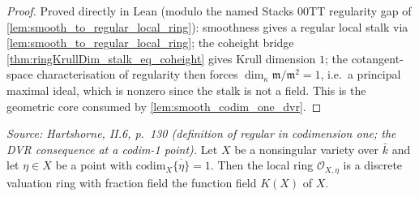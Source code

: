 \begin{proof}
  Proved directly in Lean (modulo the named Stacks 00TT regularity gap of
  \cref{lem:smooth_to_regular_local_ring}): smoothness gives a regular local stalk via
  \cref{lem:smooth_to_regular_local_ring}; the coheight bridge
  \cref{thm:ringKrullDim_stalk_eq_coheight} gives Krull dimension \(1\); the
  cotangent-space characterisation of regularity then forces
  \(\dim_\kappa \mathfrak m/\mathfrak m^2 = 1\), i.e.\ a principal maximal ideal, which
  is nonzero since the stalk is not a field. This is the geometric core consumed by
  \cref{lem:smooth_codim_one_dvr}.
\end{proof}

\begin{lemma}


  \label{lem:smooth_codim_one_dvr}
  \textit{Source: Hartshorne, II.6, p.~130 (definition of regular in codimension one;
  the DVR consequence at a codim-1 point).}
  Let \(X\) be a nonsingular variety over \(\bar k\) and let \(\eta \in X\) be a point with
  \(\mathrm{codim}_X \overline{\{\eta\}} = 1\). Then the local ring \(\mathcal O_{X, \eta}\) is a
  discrete valuation ring with fraction field the function field \(K(X)\) of \(X\).
\end{lemma}

